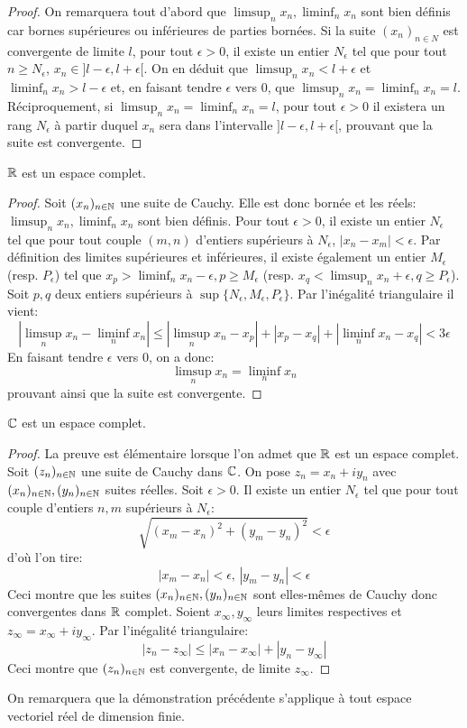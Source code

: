 \begin{proof}
On remarquera tout d'abord que $\limsup_n  x_n, \liminf_n x_n$ sont bien définis car bornes supérieures ou inférieures de parties bornées. Si la suite $(x_n)_{n \in N}$ est convergente de limite $l$, pour tout $\epsilon > 0$, il existe un entier $N_\epsilon$ tel que pour tout $n \geq N_\epsilon$, $x_n \in ]l-\epsilon, l+ \epsilon[$. On en déduit que $\limsup_n x_n < l+ \epsilon$ et $\liminf_n x_n > l- \epsilon$ et, en faisant tendre $\epsilon$ vers 0, que $\limsup_n x_n = \liminf_n x_n= l$. Réciproquement, si $\limsup_n x_n = \liminf_n x_n= l$, pour tout $\epsilon > 0$ il existera un rang $N_\epsilon$ à partir duquel $x_n$ sera dans l'intervalle $]l-\epsilon, l+\epsilon[$, prouvant que la suite est convergente. 
\end{proof}
\begin{fprop}
$\mathbb R$ est un espace complet.
\end{fprop}
\begin{proof}
Soit $(x_n)_{n \in {\mathbb N}}$ une suite de Cauchy. Elle est donc bornée et les réels:  $\limsup_n  x_n, \liminf_n x_n$ sont bien définis.
 Pour tout $\epsilon > 0$, il existe un entier $N_\epsilon$ tel que pour tout couple $(m,n)$ d'entiers supérieurs
  à $N_\epsilon$, $|x_n-x_m| < \epsilon$. Par définition des limites supérieures et inférieures, 
  il existe également un entier $M_\epsilon$ (resp. $P_\epsilon$) tel que $x_p > \liminf_n x_n - \epsilon, p \geq M_\epsilon$ (resp. $x_q < \limsup_n x_n +  \epsilon, q \geq P_\epsilon$). Soit $p,q$ deux entiers supérieurs à $\sup \{ N_\epsilon, M_\epsilon, P_\epsilon\}$. Par l'inégalité triangulaire il vient:
\[
\left |\limsup_n x_n - \liminf_n x_n \right | \leq 
\left| \limsup_n x_n - x_p\right | + \left| x_p - x_q\right | + 
\left| \liminf_n x_n - x_q\right |  < 3 \epsilon
\]
En faisant tendre $\epsilon$ vers 0, on a donc:
\[
\limsup_n x_n = \liminf_n x_n 
\]
prouvant ainsi que la suite est convergente. 
\end{proof}
\begin{fprop}
	$\mathbb{C}$ est un espace complet.
\end{fprop}
\begin{proof}
	La preuve est élémentaire lorsque l'on admet que $\mathbb R$ est un espace complet. Soit $(z_n)_{n \in {\mathbb N}}$ une suite de Cauchy dans $\mathbb{C}$. On pose $z_n = x_n + i y_n$ avec $(x_n)_{n \in {\mathbb N}},(y_n)_{n \in {\mathbb N}}$ suites réelles. Soit $\epsilon > 0$. Il existe un entier $N_\epsilon$ tel que pour tout couple d'entiers $n,m$ supérieurs à $N_\epsilon$:
	\[
	\sqrt{(x_m-x_n)^2+(y_m-y_n)^2} < \epsilon
	\]
	d'où l'on tire:
	\[
	|x_m-x_n|<\epsilon, \, |y_m-y_n| < \epsilon
	\]
	Ceci montre que les suites $(x_n)_{n \in {\mathbb N}},(y_n)_{n \in {\mathbb N}}$ sont elles-mêmes de Cauchy donc convergentes dans $\mathbb R$ complet. Soient $x_\infty,y_\infty$ leurs limites respectives et $z_\infty=x_\infty+iy_\infty$. Par l'inégalité triangulaire:
	\[
	|z_n - z_\infty| \leq |x_n - x_\infty|+|y_n-y_\infty|
	\]
	Ceci montre que $(z_n)_{n \in {\mathbb N}}$ est convergente, de limite $z_\infty$.
\end{proof}
\begin{rem}
On remarquera que la démonstration précédente s'applique à tout espace vectoriel réel de dimension finie.
\end{rem}
